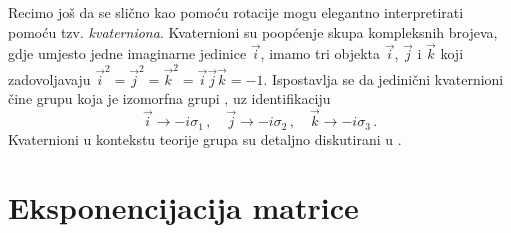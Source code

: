 Recimo još da se slično kao pomoću  rotacije mogu elegantno
interpretirati pomoću tzv. \emph{kvaterniona}. Kvaternioni su poopćenje 
skupa kompleksnih brojeva, gdje umjesto jedne imaginarne jedinice $\vec{i}$,
imamo tri objekta $\vec{i}$, $\vec{j}$ i $\vec{k}$ koji zadovoljavaju
$\vec{i}^2 = \vec{j}^2 = \vec{k}^2 = \vec{i}\vec{j}\vec{k} = -1$. 
Ispostavlja se da jedinični kvaternioni čine grupu koja
je izomorfna grupi , uz identifikaciju
\begin{equation}
    \vec{i} \to -i \sigma_1\,, \quad
    \vec{j} \to -i \sigma_2\,, \quad
    \vec{k} \to -i \sigma_3\,.
\end{equation}
Kvaternioni u kontekstu teorije grupa su detaljno diskutirani u \cite{Stilwell:2008}.

\chapter{Eksponencijacija matrice}
\label{sec:expmat}

